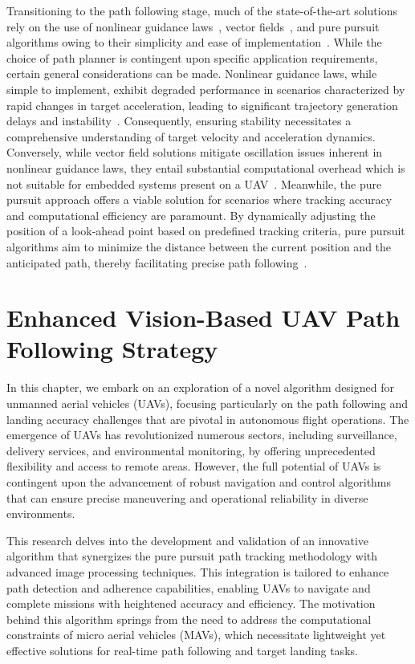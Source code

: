 Transitioning to the path following stage, much of the state-of-the-art solutions~\cite{8_sujit2013evaluation, 12_pelizer2017comparison} rely on the use of nonlinear guidance laws~\cite{Keshmiri2018ICUAS}, vector fields~\cite{Tuttle2021ARC}, and pure pursuit algorithms owing to their simplicity and ease of implementation~\cite{Baqir2020IOP}. While the choice of path planner is contingent upon specific application requirements, certain general considerations can be made. Nonlinear guidance laws, while simple to implement, exhibit degraded performance in scenarios characterized by rapid changes in target acceleration, leading to significant trajectory generation delays and instability~\cite{Keshmiri2018ICUAS}. Consequently, ensuring stability necessitates a comprehensive understanding of target velocity and acceleration dynamics. Conversely, while vector field solutions mitigate oscillation issues inherent in nonlinear guidance laws, they entail substantial computational overhead which is not suitable for embedded systems present on a UAV~\cite{Tuttle2021ARC}. Meanwhile, the pure pursuit approach offers a viable solution for scenarios where tracking accuracy and computational efficiency are paramount. By dynamically adjusting the position of a look-ahead point based on predefined tracking criteria, pure pursuit algorithms aim to minimize the distance between the current position and the anticipated path, thereby facilitating precise path following~\cite{Gautam2015ICUAS, 10_xavier2019path, Silano2019SMC}.



\chapter{Enhanced Vision-Based UAV Path Following Strategy}
\label{Chapter:1}


In this chapter, we embark on an exploration of a novel algorithm designed for unmanned aerial vehicles (UAVs), focusing particularly on the path following and landing accuracy challenges that are pivotal in autonomous flight operations. The emergence of UAVs has revolutionized numerous sectors, including surveillance, delivery services, and environmental monitoring, by offering unprecedented flexibility and access to remote areas. However, the full potential of UAVs is contingent upon the advancement of robust navigation and control algorithms that can ensure precise maneuvering and operational reliability in diverse environments.

This research delves into the development and validation of an innovative algorithm that synergizes the pure pursuit path tracking methodology with advanced image processing techniques. This integration is tailored to enhance path detection and adherence capabilities, enabling UAVs to navigate and complete missions with heightened accuracy and efficiency. The motivation behind this algorithm springs from the need to address the computational constraints of micro aerial vehicles (MAVs), which necessitate lightweight yet effective solutions for real-time path following and target landing tasks.

